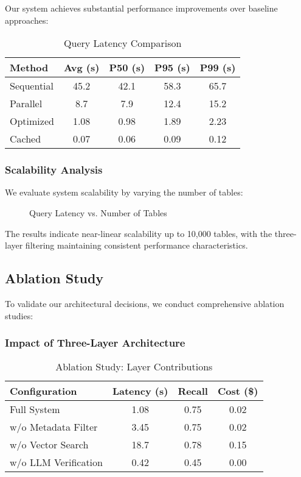 \documentclass[conference]{IEEEtran}
\begin{document}
Our system achieves substantial performance improvements over baseline approaches:

\begin{table}[htbp]
\caption{Query Latency Comparison}
\label{tab:latency}
\centering
\begin{tabular}{lcccc}
\toprule
\textbf{Method} & \textbf{Avg (s)} & \textbf{P50 (s)} & \textbf{P95 (s)} & \textbf{P99 (s)} \\
\midrule
Sequential & 45.2 & 42.1 & 58.3 & 65.7 \\
Parallel & 8.7 & 7.9 & 12.4 & 15.2 \\
Optimized & 1.08 & 0.98 & 1.89 & 2.23 \\
Cached & 0.07 & 0.06 & 0.09 & 0.12 \\
\bottomrule
\end{tabular}
\end{table}

\subsubsection{Scalability Analysis}

We evaluate system scalability by varying the number of tables:

\begin{figure}[htbp]
    \centering
    \caption{Query Latency vs. Number of Tables}
    \label{fig:scalability}
\end{figure}

The results indicate near-linear scalability up to 10,000 tables, with the three-layer filtering maintaining consistent performance characteristics.

\subsection{Ablation Study}

To validate our architectural decisions, we conduct comprehensive ablation studies:

\subsubsection{Impact of Three-Layer Architecture}

\begin{table}[htbp]
\caption{Ablation Study: Layer Contributions}
\label{tab:ablation}
\centering
\begin{tabular}{lccc}
\toprule
\textbf{Configuration} & \textbf{Latency (s)} & \textbf{Recall} & \textbf{Cost (\$)} \\
\midrule
Full System & 1.08 & 0.75 & 0.02 \\
w/o Metadata Filter & 3.45 & 0.75 & 0.02 \\
w/o Vector Search & 18.7 & 0.78 & 0.15 \\
w/o LLM Verification & 0.42 & 0.45 & 0.00 \\
\bottomrule
\end{tabular}
\end{table}
\end{document}

